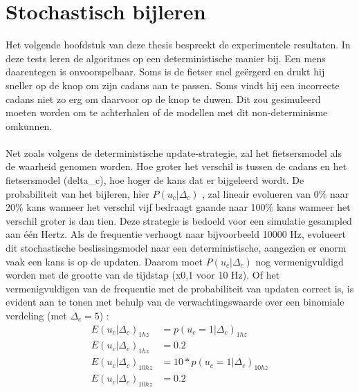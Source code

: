 \section{Stochastisch bijleren}
Het volgende hoofdstuk van deze thesis bespreekt de experimentele resultaten. In deze tests leren de algoritmes op een deterministische manier bij. Een mens daarentegen is onvoorspelbaar. Soms is de fietser snel geërgerd en drukt hij sneller op de knop om zijn cadans aan te passen. Soms vindt hij een incorrecte cadans niet zo erg om daarvoor op de knop te duwen. Dit zou gesimuleerd moeten worden om te achterhalen of de modellen met dit non-determinisme omkunnen. 
\\\\
Net zoals volgens de deterministische update-strategie, zal het fietsersmodel als de waarheid genomen worden. Hoe groter het verschil is tussen de cadans en het fietsersmodel (\gls{delta_c}), hoe hoger de kans dat er bijgeleerd wordt. De probabiliteit van het bijleren, hier $P(u_c|\Delta_c)$ , zal lineair evolueren van 0\% naar 20\% kans wanneer het verschil vijf bedraagt gaande naar 100\% kans wanneer het verschil groter is dan tien. Deze strategie is bedoeld voor een simulatie gesampled aan één Hertz. Als de frequentie verhoogt naar bijvoorbeeld 10000 Hz, evolueert dit stochastische beslissingsmodel naar een deterministische, aangezien er enorm vaak een kans is op de updaten. Daarom moet $P(u_c|\Delta_c)$ nog vermenigvuldigd worden met de grootte van de tijdstap (x0,1 voor 10 Hz). Of het vermenigvuldigen van de frequentie met de probabiliteit van updaten correct is, is evident aan te tonen met behulp van de verwachtingswaarde over een binomiale verdeling (met $\Delta_c=5$) \cite{binomial wiki}:
\begin{align*}
E(u_c|\Delta_c)_{1hz} \ &=p(u_c=1|\Delta_c)_{1hz} \\
E(u_c|\Delta_c)_{1hz} \ &=0.2 \\
E(u_c|\Delta_c)_{10hz}&=10*p(u_c=1|\Delta_c)_{10hz} \\
E(u_c|\Delta_c)_{10hz}&=0.2
\end{align*}

